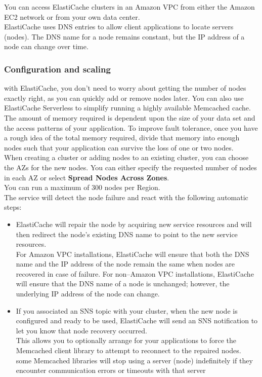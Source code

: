 \documentclass[12pt, letterpaper, twoside]{article}
\begin{document}
You can access ElastiCache clusters in an Amazon VPC from either the Amazon EC2 network or from your own data center.\\
ElastiCache uses DNS entries to allow client applications to locate servers (nodes). The DNS name for a node remains 
constant, but the IP address of a node can change over time.\\

\subsubsection{Configuration and scaling}
with ElastiCache, you don't need to worry about getting the number of nodes exactly right, as you can quickly add or 
remove nodes later. You can also use ElastiCache Serverless to simplify running a highly available Memcached cache.\\

The amount of memory required is dependent upon the size of your data set and the access patterns of your application. 
To improve fault tolerance, once you have a rough idea of the total memory required, divide that memory into enough 
nodes such that your application can survive the loss of one or two nodes.\\

When creating a cluster or adding nodes to an existing cluster, you can choose the AZs for the new nodes. You can either 
specify the requested number of nodes in each AZ or select \textbf{Spread Nodes Across Zones}.\\

You can run a maximum of 300 nodes per Region.\\

The service will detect the node failure and react with the following automatic steps:
\begin{itemize}
	\item ElastiCache will repair the node by acquiring new service resources and will then redirect the node's existing 
		DNS name to point to the new service resources.\\
		For Amazon VPC installations, ElastiCache will ensure that both the DNS name and the IP address of the node remain 
		the same when nodes are recovered in case of failure. For non–Amazon VPC installations, ElastiCache will ensure that 
		the DNS name of a node is unchanged; however, the underlying IP address of the node can change.
	\item If you associated an SNS topic with your cluster, when the new node is configured and ready to be used, ElastiCache 
		will send an SNS notification to let you know that node recovery occurred.\\
		This allows you to optionally arrange for your applications to force the Memcached client library to attempt to 
		reconnect to the repaired nodes.\\
		some Memcached libraries will stop using a server (node) indefinitely if they encounter communication errors or 
		timeouts with that server
\end{itemize}
\end{document}
